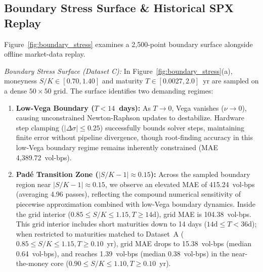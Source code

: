 \documentclass[sigconf,anonymous,review]{acmart}
\begin{document}
\subsection{Boundary Stress Surface \& Historical SPX Replay}
Figure~\ref{fig:boundary_stress} examines a 2,500-point boundary surface alongside offline market-data replay.

\textit{Boundary Stress Surface (Dataset C):} In Figure~\ref{fig:boundary_stress}(a), moneyness $S/K \in [0.70, 1.40]$ and maturity $T \in [0.0027, 2.0]$~yr are sampled on a dense $50 \times 50$ grid. The surface identifies two demanding regimes:
\begin{enumerate}
    \item \textbf{Low-Vega Boundary ($T < 14$~days):} As $T \to 0$, Vega vanishes ($\nu \to 0$), causing unconstrained Newton-Raphson updates to destabilize. Hardware step clamping ($|\Delta\sigma| \le 0.25$) successfully bounds solver steps, maintaining finite error without pipeline divergence, though root-finding accuracy in this low-Vega boundary regime remains inherently constrained (MAE 4,389.72~vol-bps).
    \item \textbf{Pad\'{e} Transition Zone ($|S/K - 1| \approx 0.15$):} Across the sampled boundary region near $|S/K - 1| \approx 0.15$, we observe an elevated MAE of 415.24~vol-bps (averaging 4.96 passes), reflecting the compound numerical sensitivity of piecewise approximation combined with low-Vega boundary dynamics. Inside the grid interior ($0.85 \le S/K \le 1.15, T \ge 14\text{d}$), grid MAE is 104.38~vol-bps. This grid interior includes short maturities down to 14 days ($14\text{d} \le T < 36\text{d}$); when restricted to maturities matched to Dataset~A ($0.85 \le S/K \le 1.15, T \ge 0.10$~yr), grid MAE drops to 15.38~vol-bps (median 0.64~vol-bps), and reaches 1.39~vol-bps (median 0.38~vol-bps) in the near-the-money core ($0.90 \le S/K \le 1.10, T \ge 0.10$~yr).
\end{enumerate}
\end{document}
